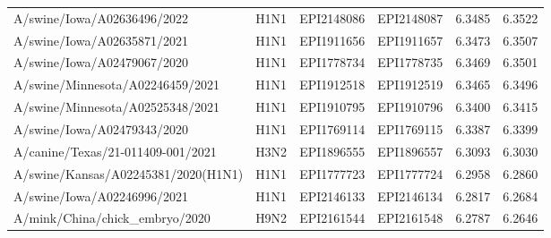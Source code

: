 \begin{tabular}{L{1.95in}|L{.25in}|L{.60in}|L{.6in}|C{1in}|C{1in}}
 A/swine/Iowa/A02636496/2022 &H1N1&EPI2148086&EPI2148087&6.3485&6.3522\\
 A/swine/Iowa/A02635871/2021 &H1N1&EPI1911656&EPI1911657&6.3473&6.3507\\
 A/swine/Iowa/A02479067/2020 &H1N1&EPI1778734&EPI1778735&6.3469&6.3501\\
 A/swine/Minnesota/A02246459/2021 &H1N1&EPI1912518&EPI1912519&6.3465&6.3496\\
 A/swine/Minnesota/A02525348/2021 &H1N1&EPI1910795&EPI1910796&6.3400&6.3415\\
 A/swine/Iowa/A02479343/2020 &H1N1&EPI1769114&EPI1769115&6.3387&6.3399\\
 A/canine/Texas/21-011409-001/2021 &H3N2&EPI1896555&EPI1896557&6.3093&6.3030\\
 A/swine/Kansas/A02245381/2020(H1N1) &H1N1&EPI1777723&EPI1777724&6.2958&6.2860\\
 A/swine/Iowa/A02246996/2021 &H1N1&EPI2146133&EPI2146134&6.2817&6.2684\\
 A/mink/China/chick\_embryo/2020 &H9N2&EPI2161544&EPI2161548&6.2787&6.2646\\
\hline\end{tabular}
